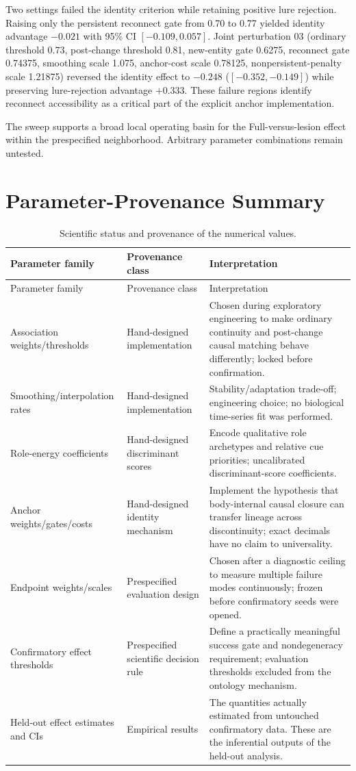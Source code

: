 \documentclass[10pt,journal,onecolumn]{IEEEtran}
\begin{document}
Two settings failed the identity criterion while retaining positive lure rejection. Raising only the persistent reconnect gate from 0.70 to 0.77 yielded identity advantage $-0.021$ with 95\% CI $[-0.109,0.057]$. Joint perturbation 03 (ordinary threshold 0.73, post-change threshold 0.81, new-entity gate 0.6275, reconnect gate 0.74375, smoothing scale 1.075, anchor-cost scale 0.78125, nonpersistent-penalty scale 1.21875) reversed the identity effect to $-0.248$ ($[-0.352,-0.149]$) while preserving lure-rejection advantage $+0.333$. These failure regions identify reconnect accessibility as a critical part of the explicit anchor implementation.

The sweep supports a broad local operating basin for the Full-versus-lesion effect within the prespecified neighborhood. Arbitrary parameter combinations remain untested.

\section{Parameter-Provenance Summary}
\begin{longtable}{@{}p{}p{}p{}@{}}
\caption{Scientific status and provenance of the numerical values.}\label{tab:provenance}\\
\toprule
Parameter family & Provenance class & Interpretation \\
\midrule
\endfirsthead
\toprule
Parameter family & Provenance class & Interpretation \\
\midrule
\endhead
Association weights/thresholds & Hand-designed implementation & Chosen during exploratory engineering to make ordinary continuity and post-change causal matching behave differently; locked before confirmation. \\
Smoothing/interpolation rates & Hand-designed implementation & Stability/adaptation trade-off; engineering choice; no biological time-series fit was performed. \\
Role-energy coefficients & Hand-designed discriminant scores & Encode qualitative role archetypes and relative cue priorities; uncalibrated discriminant-score coefficients. \\
Anchor weights/gates/costs & Hand-designed identity mechanism & Implement the hypothesis that body-internal causal closure can transfer lineage across discontinuity; exact decimals have no claim to universality. \\
Endpoint weights/scales & Prespecified evaluation design & Chosen after a diagnostic ceiling to measure multiple failure modes continuously; frozen before confirmatory seeds were opened. \\
Confirmatory effect thresholds & Prespecified scientific decision rule & Define a practically meaningful success gate and nondegeneracy requirement; evaluation thresholds excluded from the ontology mechanism. \\
Held-out effect estimates and CIs & Empirical results & The quantities actually estimated from untouched confirmatory data. These are the inferential outputs of the held-out analysis. \\
\bottomrule
\end{longtable}
\end{document}
